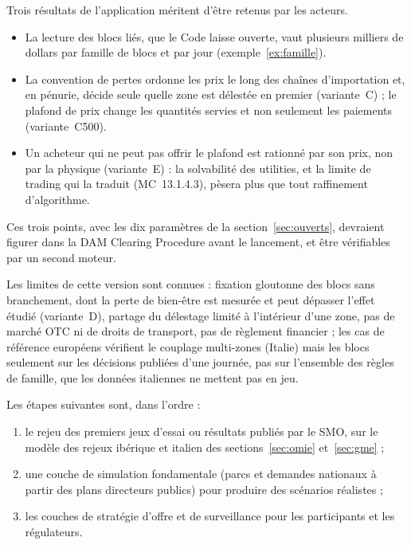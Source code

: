 \documentclass[a4paper,12pt]{article}
\theoremstyle{definition}
\newcommand{\MC}[1]{MC~#1}
\begin{document}
Trois résultats de l'application méritent d'être retenus par les acteurs.

\begin{itemize}
\item La lecture des blocs liés, que le Code laisse ouverte, vaut plusieurs milliers de dollars par famille de blocs et par jour (exemple~\ref{ex:famille}).
\item La convention de pertes ordonne les prix le long des chaînes d'importation et, en pénurie, décide seule quelle zone est délestée en premier (variante~C) ; le plafond de prix change les quantités servies et non seulement les paiements (variante~C500).
\item Un acheteur qui ne peut pas offrir le plafond est rationné par son prix, non par la physique (variante~E) : la solvabilité des utilities, et la limite de trading qui la traduit (\MC{13.1.4.3}), pèsera plus que tout raffinement d'algorithme.
\end{itemize}

Ces trois points, avec les dix paramètres de la section~\ref{sec:ouverts}, devraient figurer dans la DAM Clearing Procedure avant le lancement, et être vérifiables par un second moteur.

Les limites de cette version sont connues : fixation gloutonne des blocs sans branchement, dont la perte de bien-être est mesurée et peut dépasser l'effet étudié (variante~D), partage du délestage limité à l'intérieur d'une zone, pas de marché OTC ni de droits de transport, pas de règlement financier ; les cas de référence européens vérifient le couplage multi-zones (Italie) mais les blocs seulement sur les décisions publiées d'une journée, pas sur l'ensemble des règles de famille, que les données italiennes ne mettent pas en jeu.

Les étapes suivantes sont, dans l'ordre :

\begin{enumerate}
\item le rejeu des premiers jeux d'essai ou résultats publiés par le SMO, sur le modèle des rejeux ibérique et italien des sections~\ref{sec:omie} et~\ref{sec:gme} ;
\item une couche de simulation fondamentale (parcs et demandes nationaux à partir des plans directeurs publics) pour produire des scénarios réalistes ;
\item les couches de stratégie d'offre et de surveillance pour les participants et les régulateurs.
\end{enumerate}
\end{document}
